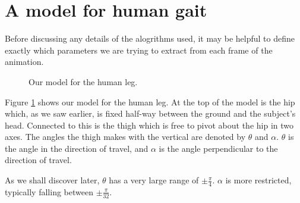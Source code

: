 \section{A model for human gait}
\label{Design:Model}

Before discussing any details of the alogrithms used, it may be helpful to define exactly which parameters
we are trying to extract from each frame of the animation.

\begin{figure}[b]
	\centering
	\qquad
	\caption{Our model for the human leg.}
	\label{ModelImages}
\end{figure}

Figure \ref{ModelImages} shows our model for the human leg.
At the top of the model is the hip which, as we saw earlier, is fixed half-way between the ground and the subject's head.
Connected to this is the thigh which is free to pivot about the hip in two axes.
The angles the thigh makes with the vertical are denoted by $\theta$ and $\alpha$.
$\theta$ is the angle in the direction of travel, and $\alpha$ is the angle perpendicular to the direction of travel.

As we shall discover later, $\theta$ has a very large range of $\pm \frac{\pi}{4}$.
$\alpha$ is more restricted, typically falling between $\pm \frac{\pi}{32}$.
